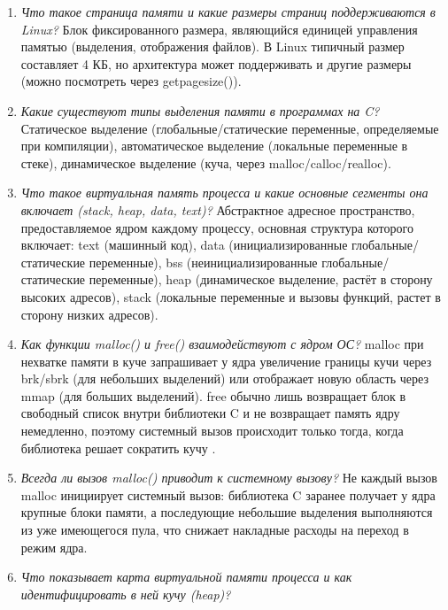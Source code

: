 \begin{enumerate}
	\item \textit{Что такое страница памяти и какие размеры страниц поддерживаются в Linux?}\newline 
	Блок фиксированного размера, являющийся единицей управления памятью (выделения, отображения файлов). 
	В Linux типичный размер составляет 4 КБ, но архитектура может поддерживать и другие размеры (можно посмотреть через getpagesize()).
	\item \textit{Какие существуют типы выделения памяти в программах на C?}\newline 
	Статическое выделение (глобальные/статические переменные, определяемые при компиляции), автоматическое выделение (локальные переменные в стеке), динамическое выделение (куча, через malloc/calloc/realloc).
	\item \textit{Что такое виртуальная память процесса и какие основные сегменты она включает (stack, heap, data, text)?}\newline 
	Абстрактное адресное пространство, предоставляемое ядром каждому процессу, основная структура которого включает: 
	text (машинный код), 
	data (инициализированные глобальные/статические переменные), 
	bss (неинициализированные глобальные/статические переменные), 
	heap (динамическое выделение, растёт в сторону высоких адресов), 
	stack (локальные переменные и вызовы функций, растет в сторону низких адресов).
	\item \textit{Как функции malloc() и free() взаимодействуют с ядром ОС?}\newline 
	malloc при нехватке памяти в куче запрашивает у ядра увеличение границы кучи через brk/sbrk (для небольших выделений) или отображает новую область через mmap (для больших выделений).
	free обычно лишь возвращает блок в свободный список внутри библиотеки C и не возвращает память ядру немедленно, поэтому системный вызов происходит только тогда, когда библиотека решает сократить кучу .
	\item \textit{Всегда ли вызов malloc() приводит к системному вызову?}\newline 
	Не каждый вызов malloc инициирует системный вызов: библиотека C заранее получает у ядра крупные блоки памяти, а последующие небольшие выделения выполняются из уже имеющегося пула, что снижает накладные расходы на переход в режим ядра.
	\item \textit{Что показывает карта виртуальной памяти процесса и как идентифицировать в ней кучу (heap)?}\newline 

\end{enumerate}

